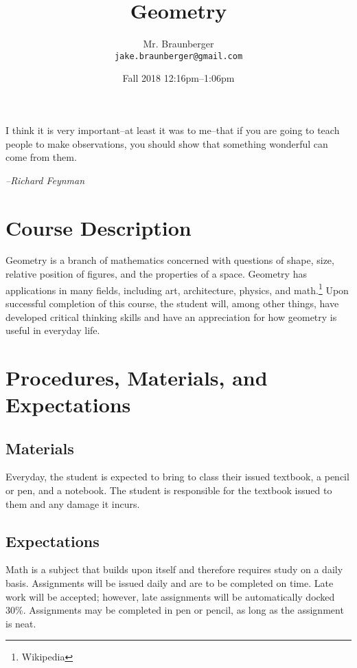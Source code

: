 \documentclass[11pt,article,oneside]{memoir}
\begin{document}
\title{\LARGE Geometry}
\author{\Large Mr. Braunberger \newline \\ \footnotesize\texttt{\noindent jake.braunberger@gmail.com}}
\date{\hspace*{2.3cm}Fall 2018 \newline \noindent \hspace*{-1.5cm} 12:16pm--1:06pm}

\setlength{\epigraphwidth}{.8\textwidth}

\maketitle

\epigraph{I think it is very important--at least it was to me--that if you are going to teach people to make observations, you should show that something wonderful can come from them.}{\textit{--Richard Feynman}}




\section*{Course Description}
Geometry is a branch of mathematics concerned with questions of shape, size, relative position
of figures, and the properties of a space. Geometry has applications in many fields, including art, architecture, 
physics, and math.\footnote{Wikipedia} Upon successful completion of this course, the student will, among other things, have
developed critical thinking skills and have an appreciation for how geometry is useful in everyday life.


\section*{Procedures, Materials, and Expectations}
\subsection*{Materials}
	Everyday, the student is expected to bring to class their issued textbook, a pencil or pen, and a notebook. The student is responsible
for the textbook issued to them and any damage it incurs.
\subsection*{Expectations}
	Math is a subject that builds upon itself and therefore requires study on a daily basis.
	Assignments will be issued daily and are to be completed on time. Late work will be accepted; however,
late assignments will be automatically docked 30\%. Assignments may be completed in pen or pencil, as long as the assignment is neat.
\end{document}
